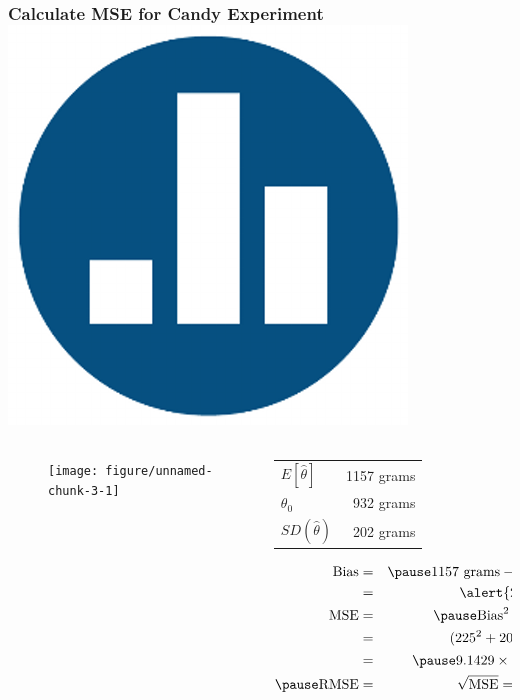 \begin{frame}
\frametitle{Calculate MSE for Candy Experiment \hfill \includegraphics[scale = 0.05]{./images/clicker}}


\begin{columns} 

\begin{column}[c]{4cm} 
\begin{figure}
\begin{knitrout}
\color{fgcolor}

{\centering \texttt{[image: figure/unnamed-chunk-3-1]} 

}



\end{knitrout}
\end{figure}

\end{column} 

\begin{column}[c]{6cm} 
\small
   \begin{tabular}{lr}
   \hline
   \hline
   $E[\hat{\theta}]$& 1157 grams\\
   $\theta_0$& 932 grams\\
   $SD(\widehat{\theta})$& 202 grams\\
   \hline
   \end{tabular}
\vspace{2em}

\begin{eqnarray*}
	\mbox{Bias} &=& \pause 1157 \mbox{ grams} - 932 \mbox{ grams}\\
		&=& \alert{225 \mbox{ grams}}\\
		\mbox{MSE} &=&\pause  \mbox{Bias}^2 + \mbox{Variance}\\
			&=& (225^2 + 202^2)\mbox{ grams}^2\\
				&=&\pause \ensuremath{9.1429\times 10^{4}} \mbox{ grams}^2\\ \pause
				\mbox{RMSE} &=& \sqrt{\mbox{MSE}} =  302 \mbox{ grams}
\end{eqnarray*}
\end{column} 


\end{columns}
\end{frame}
